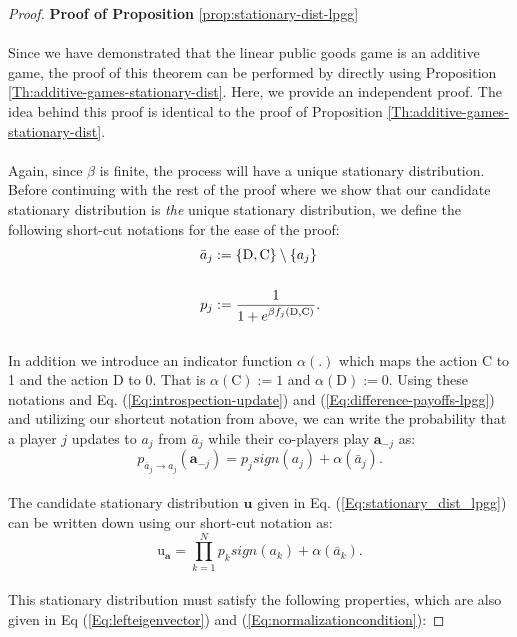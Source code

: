\documentclass[11pt]{article}
\theoremstyle{plainCl1}
\theoremstyle{plainCl2}
\newcommand{\abf}{\mathbf{a}}
\newcommand{\ubf}{\mathbf{u}}
\newcommand{\C}{\mathrm{C}}
\newcommand{\D}{\mathrm{D}}
\begin{document}
\begin{proof}
\textbf{Proof of Proposition} \ref{prop:stationary-dist-lpgg} \\ \\
Since we have demonstrated that the linear public goods game is an additive game, the proof of this theorem can be performed by directly using Proposition \ref{Th:additive-games-stationary-dist}. Here, we provide an independent proof. The idea behind this proof is identical to the proof of Proposition \ref{Th:additive-games-stationary-dist}. \\ \\
\noindent Again, since $\beta$ is finite, the process will have a unique stationary distribution. Before continuing with the rest of the proof where we show that our candidate stationary distribution is \emph{the} unique stationary distribution, we define the following short-cut notations for the ease of the proof: 
\begin{align}
\bar{a}_j &:= \{\D,\C\} \setminus \{a_j\}  \\ \notag \\ 
p_j &:= \frac{1}{1 + \displaystyle e^{\beta f_j(\D, \C)}} .
\end{align} \\
In addition we introduce an indicator function $\alpha(.)$ which maps the action $\C$ to 1 and the action $\D$ to 0. That is $\alpha(\C) := 1$ and $\alpha(\D) := 0$. Using these notations and Eq. (\ref{Eq:introspection-update}) and (\ref{Eq:difference-payoffs-lpgg}) and utilizing our shortcut notation from above, we can write the probability that a player $j$ updates to $a_j$ from $\bar{a}_j$ while their co-players play $\abf_{-j}$ as: \\
\begin{equation}
p_{\displaystyle \bar{a}_j  \to a_j} (\abf_{-j}) = p_j \mathit{sign}(a_j) + \alpha(\bar{a}_j) .
\end{equation}\\
The candidate stationary distribution $\ubf$ given in Eq. (\ref{Eq:stationary_dist_lpgg}) can be written down using our short-cut notation as: \\
\begin{equation}
\label{Eq:stationary-dist-shortcut}
\mathrm{u}_\abf = \prod_{k = 1}^{N}  p_k \mathit{sign}(a_k) + \alpha(\bar{a}_k) .
\end{equation}\\
This stationary distribution must satisfy the following properties, which are also given in Eq  (\ref{Eq:lefteigenvector}) and (\ref{Eq:normalizationcondition}):

\end{proof}
\end{document}
